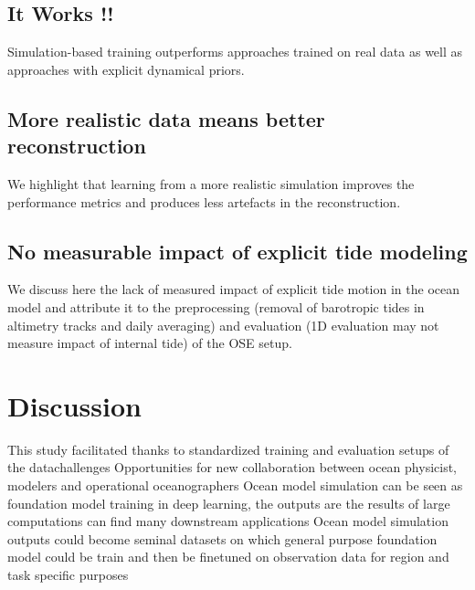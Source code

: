 \documentclass[draft]{agujournal2019}
\begin{document}
\subsection{It Works !!}
Simulation-based training outperforms approaches trained on real data as well as approaches with explicit dynamical priors.

\subsection{More realistic data means better reconstruction}
We highlight that learning from a more realistic simulation improves the performance metrics and produces less artefacts in the reconstruction. 


\subsection{No measurable impact of explicit tide modeling}
We discuss here the lack of measured impact of explicit tide motion in the ocean model and attribute it to the preprocessing (removal of barotropic tides in altimetry tracks and daily averaging) and evaluation (1D evaluation may not measure impact of internal tide) of the OSE setup.

\section{Discussion}
This study facilitated thanks to standardized training and evaluation setups of the datachallenges
Opportunities for new collaboration between ocean physicist, modelers and operational oceanographers
Ocean model simulation can be seen as foundation model training in deep learning, the outputs are the results of large computations can find many downstream applications
Ocean model simulation outputs could become seminal datasets on which general purpose foundation model could be train and then be finetuned on observation data for region and task specific purposes
\end{document}
